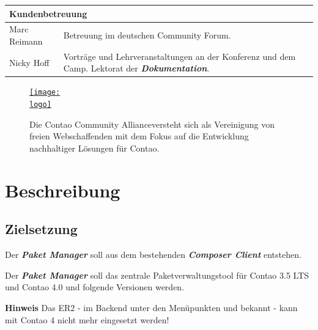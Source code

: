 \documentclass[
paper=a4,
draft=false,%
fontsize=10pt%
]{scrartcl}
\def\logo{logos/colorlogo_rgb}%
\newcommand{\packageManager}{\textbf{\textit{Paket Manager}}}
\newcommand{\documentation}{\textbf{\textit{Dokumentation}}}
\newcommand{\composerClient}{\textbf{\textit{Composer Client}}}
\begin{document}
\begin{tabularx}{\textwidth}{p{}X}
\multicolumn{2}{l}{\textbf{Kundenbetreuung}} \\
\hline
Marc Reimann        & Betreuung im deutschen Community Forum. \\
Nicky Hoff          & Vorträge und Lehrveranstaltungen an der Konferenz und dem Camp. \newline
                      Lektorat der \documentation{}. \\
\end{tabularx}

\begin{figure}[h]
\begin{center}
\href{http://c-c-a.org}{\texttt{[image: \\logo]}}
\end{center}
\begin{emquotation}
Die Contao Community Alliance\footnotemark versteht sich als Vereinigung von freien Webschaffenden mit dem Fokus auf die Entwicklung nachhaltiger Lösungen für Contao.
\end{emquotation}
\end{figure}


\newpage

%
%

\section{Beschreibung}
\label{sec:description}

\subsection{Zielsetzung}

Der \packageManager{} soll aus dem bestehenden \composerClient{} entstehen.

Der \packageManager{} soll das zentrale Paketverwaltungstool für Contao 3.5 LTS und Contao 4.0 und folgende Versionen werden.

\begin{danger}
\textbf{Hinweis} Das ER2 - im Backend unter den Menüpunkten  und  bekannt - kann mit Contao 4 nicht mehr eingesetzt werden!
\end{danger}
\end{document}
